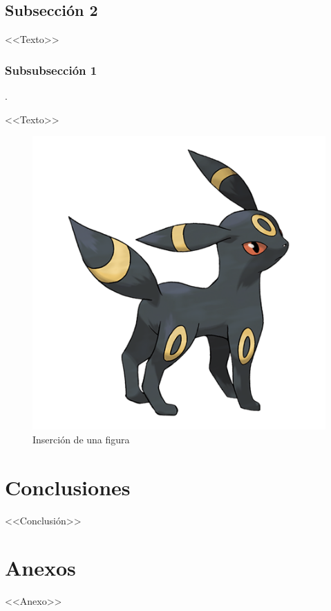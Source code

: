\begin{multicols}{2}

\subsection{Subsección 2}

<<Texto>>

\subsubsection{Subsubsección 1}.

<<Texto>>

\begin{figure}[H]
    \centering
    \includegraphics[scale=0.32]{pollito.png}
    \caption{Inserción de una figura}
    \label{figura}
\end{figure}

\section{Conclusiones}

<<Conclusión>>

\end{multicols}

\section{Anexos}

<<Anexo>>

